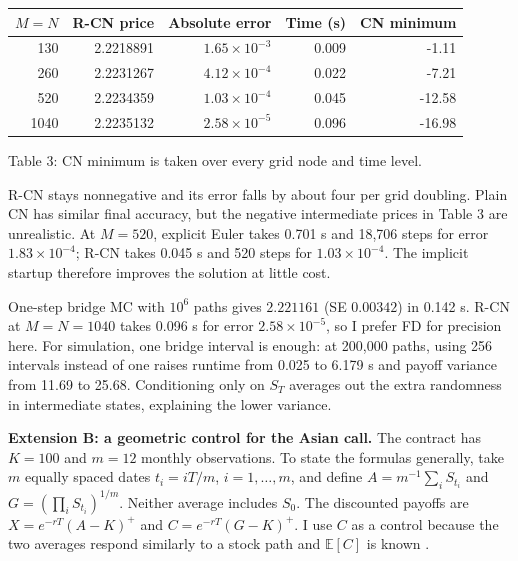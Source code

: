 \documentclass[12pt]{article}
\theoremstyle{definition}
\newcommand{\E}{\mathbb{E}}
\begin{document}
\begin{center}
\setlength{\tabcolsep}{5pt}
\begin{tabular}{rrrrr}
\hline
$M=N$&R-CN price&Absolute error&Time (s)&CN minimum\\\hline
130 & 2.2218891 & $1.65\times10^{-3}$ & 0.009 & -1.11 \\
260 & 2.2231267 & $4.12\times10^{-4}$ & 0.022 & -7.21 \\
520 & 2.2234359 & $1.03\times10^{-4}$ & 0.045 & -12.58 \\
1040 & 2.2235132 & $2.58\times10^{-5}$ & 0.096 & -16.98 \\
\hline
\end{tabular}

Table 3: CN minimum is taken over every grid node and time level.
\end{center}

R-CN stays nonnegative and its error falls by about four per grid doubling.
Plain CN has similar final accuracy, but the negative intermediate prices in
Table 3 are unrealistic. At $M=520$, explicit Euler takes 0.701 s and 18,706 steps
for error $1.83\times10^{-4}$; R-CN takes 0.045 s and 520 steps for
$1.03\times10^{-4}$. The implicit startup therefore improves the solution at little cost.

One-step bridge MC with $10^6$ paths gives $2.221161$ (SE $0.00342$) in 0.142 s.
R-CN at $M=N=1040$ takes 0.096 s for error $2.58\times10^{-5}$, so I prefer FD
for precision here. For simulation, one bridge interval is enough: at 200,000 paths,
using 256 intervals instead of one raises runtime from 0.025 to 6.179 s and payoff
variance from 11.69 to 25.68. Conditioning only on $S_T$ averages out the extra
randomness in intermediate states, explaining the lower variance.

\textbf{Extension B: a geometric control for the Asian call.}
The contract has $K=100$ and $m=12$ monthly observations. To state the formulas
generally, take $m$ equally spaced dates $t_i=iT/m$, $i=1,\ldots,m$, and define
$A=m^{-1}\sum_i S_{t_i}$ and $G=(\prod_i S_{t_i})^{1/m}$. Neither average includes
$S_0$. The discounted payoffs are $X=e^{-rT}(A-K)^+$ and $C=e^{-rT}(G-K)^+$.
I use $C$ as a control because the two averages respond similarly to a stock path
and $\E[C]$ is known \cite{control}.
\end{document}
